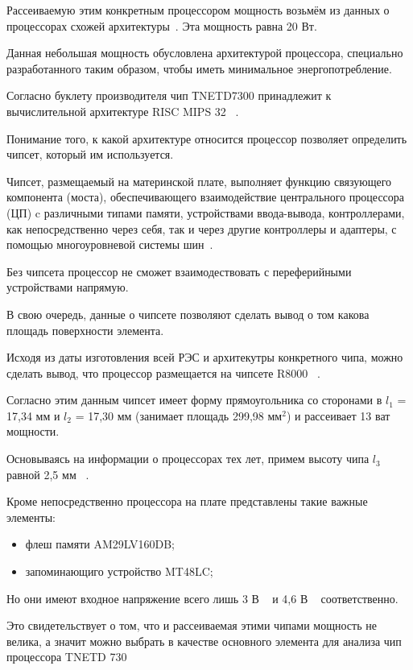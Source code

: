 Рассеиваемую этим конкретным процессором мощность возьмём из данных о
процессорах схожей архитектуры~\cite{R10000_Derivatives}.
Эта мощность равна 20 Вт. 

Данная небольшая мощность обусловлена архитектурой процессора,
специально разработанного таким образом, чтобы иметь минимальное
энергопотребление.

Согласно буклету производителя чип ТNETD7300 принадлежит к
вычислительной архитектуре RISC MIPS 32 ~\cite{AR7_fact_sheet}.

Понимание того, к какой архитектуре относится процессор позволяет
определить чипсет, который им используется.

Чипсет, размещаемый на материнской плате, выполняет функцию связующего
компонента (моста), обеспечивающего взаимодействие центрального
процессора (ЦП) c различными типами памяти, устройствами ввода-вывода,
контроллерами, как непосредственно через себя, так и через другие
контроллеры и адаптеры, с помощью многоуровневой системы
шин~\cite{Avdeev2019}.


Без чипсета процессор не сможет взаимодествовать с переферийными
устройствами напрямую.

В свою очередь, данные о
чипсете позволяют сделать вывод о том какова площадь поверхности
элемента.


Исходя из даты изготовления всей РЭС и архитекутры конкретного чипа,
можно сделать вывод, что процессор размещается на чипсете R8000
~\cite{R8000_physical_wikipedia}.

Согласно этим данным чипсет имеет форму прямоугольника со сторонами в
$l_1$ = 17,34 мм и $l_2$ = 17,30 мм (занимает площадь 299,98 мм$^2$) и
рассеивает 13 ват мощности.


Основываясь на информации о процессорах тех лет, примем высоту чипа
$l_3$ равной 2,5 мм ~\cite{MobilePentium3_wikipedia}.


Кроме непосредственно процессора на плате представлены такие важные элементы:
\begin{itemize}[nosep]
\item флеш памяти AM29LV160DB;
\item запоминающиго устройство MT48LC;
\end{itemize}

Но они имеют входное напряжение всего лишь 3 В ~\cite{SDRAM_Datasheet}
и 4,6 В ~\cite{FlashMemoryDatasheet}
соответственно.

Это свидетельствует о том, что и рассеиваемая этими чипами мощность не
велика, а значит можно выбрать в качестве основного элемента для
анализа чип процессора TNETD 730


